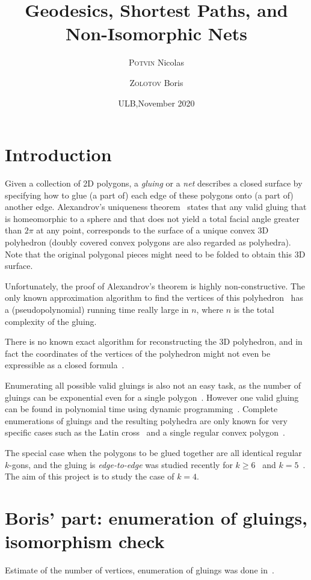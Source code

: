 \documentclass[a4paper,11pt]{article}
\title{Geodesics, Shortest Paths, and Non-Isomorphic Nets}
\author{{\scshape Potvin} Nicolas \and {\scshape Zolotov} Boris}
\date{ULB,\quad November 2020}
\begin{document}
 \maketitle

\section{Introduction}

Given a collection of 2D polygons, a \emph{gluing} or a \emph{net} describes a closed surface by specifying how to glue (a part of) each edge of these polygons onto (a part of) another edge. Alexandrov's uniqueness theorem~\cite{alex} states that any valid gluing that is homeomorphic to a sphere and that does not yield a total facial angle greater than $2\pi$ at any point, corresponds to the surface of a unique convex 3D polyhedron (doubly covered convex polygons are also regarded as polyhedra). Note that the original polygonal pieces might need to be folded to obtain this 3D surface.

Unfortunately, the proof of Alexandrov's theorem is highly non-constructive. The only known approximation algorithm to find the vertices of this polyhedron~\cite{kpd09-approx} has a (pseudopolynomial) running time really large in $n$, where $n$ is the total complexity of the gluing.

There is no known exact algorithm for reconstructing the 3D polyhedron, and in fact the coordinates of the vertices of the polyhedron might not even be expressible as a closed formula~\cite{bannister2014galois}.

Enumerating all possible valid gluings is also not an easy task, as the number of gluings can be exponential even for a single polygon~\cite{DDLO02}. However one valid gluing can be found in polynomial time using dynamic programming~\cite{DO07,lo96-dynprog}. Complete enumerations of gluings and the resulting polyhedra are only known for very specific cases such as the Latin cross~\cite{ddlop99} and a single regular convex polygon~\cite{DO07}.

The special case when the polygons to be glued together are all identical regular $k$-gons, and the gluing is \emph{edge-to-edge} was studied recently for $k \ge 6$~\cite{kl17-hex} and $k=5$~\cite{alz-penta}. The aim of this project is to study the case of $k=4$.



\section{Boris' part: enumeration of gluings, isomorphism check}

Estimate of the number of vertices, enumeration of gluings was done in~\cite{kl17-hex,alz-penta}.



{}

\end{document}
